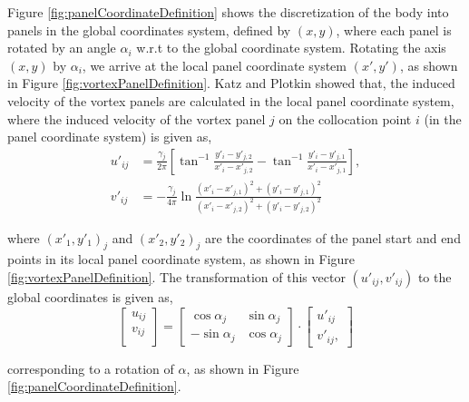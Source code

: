 Figure \ref{fig:panelCoordinateDefinition} shows the discretization of the body into panels in the global coordinates system, defined by $(x,y)$, where each panel is rotated by an angle $\alpha_i$ w.r.t to the global coordinate system. Rotating the axis $(x,y)$ by $\alpha_i$, we arrive at the local panel coordinate system $(x',y')$, as shown in Figure \ref{fig:vortexPanelDefinition}. Katz and Plotkin \cite{Katz2001a} showed that, the induced velocity of the vortex panels are calculated in the local panel coordinate system, where the induced velocity of the vortex panel $j$ on the collocation point $i$ (in the panel coordinate system) is given as,
	\begin{subequations}
	\begin{align}
	u'_{ij} &= \frac{\gamma_j}{2\pi}\left[\tan^{-1}\frac{y'_i-y'_{j,2}}{x'_i-x'_{j,2}} - \tan^{-1}\frac{y'_i-y'_{j,1}}{x'_i -x'_{j,1}}\right],\\
	v'_{ij} &= -\frac{\gamma_j}{4\pi}\ln\frac{\left(x'_i-x'_{j,1}\right)^2 + \left(y'_i-y'_{j,1}\right)^2}{\left(x'_i-x'_{j,2}\right)^2+\left(y'_i-y'_{j,2}\right)^2}
	\end{align}
	\end{subequations}

where $(x'_1,y'_1)_j$ and $(x'_2,y'_2)_j$ are the coordinates of the panel start and end points in its local panel coordinate system, as shown in Figure \ref{fig:vortexPanelDefinition}. The transformation of this vector $(u'_{ij}, v'_{ij})$ to the global coordinates is given as,
	\begin{equation}
	\begin{bmatrix}
	u_{ij}\\
	v_{ij}\\
	\end{bmatrix} = \begin{bmatrix}
	\cos\alpha_j & \sin\alpha_j \\
	-\sin\alpha_j & \cos\alpha_j
	\end{bmatrix} \cdot \begin{bmatrix}
	u'_{ij}\\
	v'_{ij},
	\end{bmatrix}
	\end{equation}

corresponding to a rotation of $\alpha$, as shown in Figure \ref{fig:panelCoordinateDefinition}.

